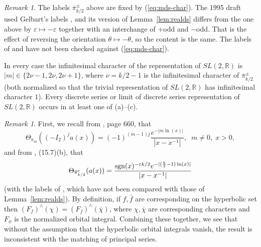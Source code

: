 \documentclass[12pt,letterpaper]{book}
\theoremstyle{plain}
\theoremstyle{definition}
\theoremstyle{remark}
\newtheorem{remark}[theorem]{Remark}
\theoremstyle{remark}
\newtheorem{remyy}{Remark}
\DeclareMathOperator{\sgn}{sgn}
\begin{document}
\begin{remyy}\label{rem26:ds-labels}
The labels $\overline\pi{}^{\pm}_{k/2}$ above are fixed by
(\ref{eq:mds-char}). The 1995 draft used Gelbart's labels \cite{Ge2},
and its version of Lemma~\ref{lem:realds} differs from the one above by
$\varepsilon\mapsto-\varepsilon$ together with an interchange of $+$odd and
$-$odd. That is the effect of reversing the orientation
$\theta\mapsto-\theta$, so the content is the same. The labels of
\cite{Ge2} and \cite{Ad2} have not been checked against
(\ref{eq:mds-char}).
\end{remyy}

In every case the infinitesimal character of the representation of
$SL(2,{\mathbb R})$ is $|m|\in\{2\nu-1,2\nu,2\nu+1\}$, where
$\nu=k/2-1$ is the infinitesimal character of $\overline\pi{}^\pm_{k/2}$
(both normalized so that the trivial representation of $SL(2,{\mathbb R})$
has infinitesimal character $1$). Every discrete series or limit of
discrete series representation of $SL(2,{\mathbb R})$ occurs in at least
one of (a)--(c).

\begin{remark}
First, we recall from \cite{HC2}, page 660, that
\[
\Theta _{\pi _m}((-I_2)^ja(x))
=(-1)^{(m-1)j}\frac{e^{-|m\ln(x)|}}{|x-x^{-1}|}%
,\;\;m\neq 0,\;x>0,
\]
and from \cite{Ad2}, (15.7)(b), that
\[
\Theta _{\overline{\pi }_{k/2}^\varepsilon }(a(x))=\frac{%
\sgn(x)^{-\varepsilon k/2}e^{-|(\frac k2-1)\ln(x)|}}{|x-x^{-1}|}
\]
(with the labels of \cite{Ad2}, which have not been compared with those
of Lemma~\ref{lem:realds}).
By definition, if $f,\overline{f}$ are corresponding on the hyperbolic set
then $(F_f)^{\wedge }(\chi )
=(F_{\overline{f}})^{\wedge }(\overline{\chi })$,
where $\chi ,\overline{\chi }$ are corresponding characters and
$F_\phi$ is the normalized orbital integral. Combining these
together, we see that without the assumption that
the hyperbolic orbital integrals vanish, the result is
inconsistent with the matching of principal series.
\end{remark}




\end{document}
